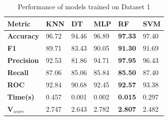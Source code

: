 \begin{table}[H]
  \centering
  \caption{Performance of models trained on Dataset 1}\label{tab:performance_of_models_trained_on_dataset_1}
  \begin{tabular}{|p{5em}|C{3em}|C{3em}|C{3em}|C{3em}|C{3em}|}
    \hline
    \textbf{Metric}      & \textbf{KNN} & \textbf{DT} & \textbf{MLP} & \textbf{RF}    & \textbf{SVM} \\
    \hline
    \textbf{Accuracy}    & 96.72        & 94.46       & 96.89        & \textbf{97.33} & 97.40        \\
    \textbf{F1}          & 89.71        & 83.43       & 90.05        & \textbf{91.30} & 91.69        \\
    \textbf{Precision}   & 92.53        & 81.86       & 94.71        & \textbf{97.95} & 96.43        \\
    \textbf{Recall}      & 87.06        & 85.06       & 85.84        & \textbf{85.50} & 87.40        \\
    \textbf{ROC}         & 92.84        & 90.68       & 92.45        & \textbf{92.57} & 93.38        \\
    \textbf{Time(s)}     & 0.457        & 0.001       & 0.002        & \textbf{0.015} & 0.297        \\
    \textbf{V$_{score}$} & 2.747        & 2.643       & 2.782        & \textbf{2.807} & 2.482        \\
    \hline
  \end{tabular}
\end{table}

